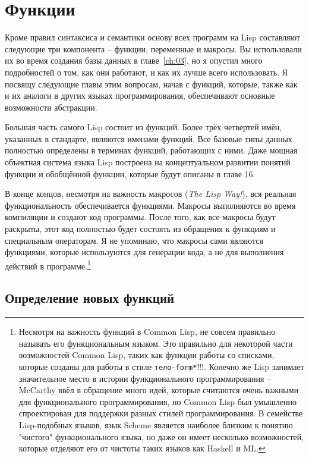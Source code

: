 \chapter{Функции}
\label{ch:05}

Кроме правил синтаксиса и семантики основу всех программ на Lisp составляют следующие три
компонента -- функции, переменные и макросы.  Вы использовали их во время создания базы
данных в главе~\ref{ch:03}, но я опустил много подробностей о том, как они работают, и как
их лучше всего использовать.  Я посвящу следующие главы этим вопросам, начав с функций,
которые, также как и их аналоги в других языках программирования, обеспечивают основные
возможности абстракции.

Большая часть самого Lisp состоит из функций.  Более трёх четвертей имён, указанных в
стандарте, являются именами функций.  Все базовые типы данных полностью определены в
терминах функций, работающих с ними. Даже мощная объектная система языка Lisp построена на
концептуальном развитии понятий функции и обобщённой функции, которые будут описаны в
главе 16.

В конце концов, несмотря на важность макросов (\textit{The Lisp Way!}), вся реальная
функциональность обеспечивается функциями.  Макросы выполняются во время компиляции и
создают код программы. После того, как все макросы будут раскрыты, этот код полностью
будет состоять из обращения к функциям и специальным операторам.  Я не упоминаю, что
макросы сами являются функциями, которые используются для генерации кода, а не для
выполнения действий в программе.\footnote{Несмотря на важность функций в Common Lisp, не
  совсем правильно называть его функциональным языком.  Это правильно для некоторой части
  возможностей Common Lisp, таких как функции работы со списками, которые созданы для
  работы в стиле \lstinline{тело-form*}!!!. Конечно же Lisp занимает значительное место в
  истории функционального программирования -- McCarthy ввёл в обращение много идей,
  которые считаются очень важными для функционального программирования, но Common Lisp был
  умышленно спроектирован для поддержки разных стилей программирования.  В семействе
  Lisp-подобных языков, язык Scheme является наиболее близким к понятию "чистого"
  функционального языка, но даже он имеет несколько возможностей, которые отделяют его от
  чистоты таких языков как Haskell и ML.}

\section{Определение новых функций}

